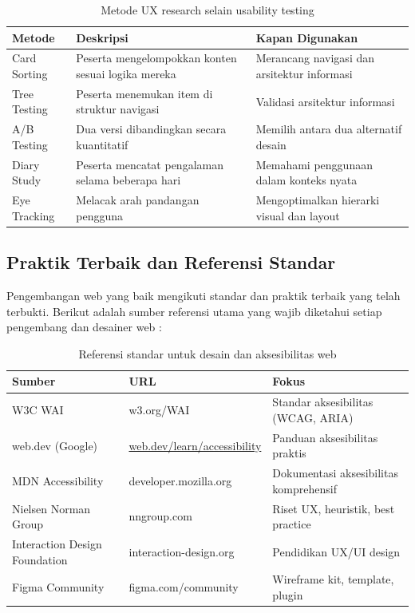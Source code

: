 \begin{table}[htbp]
\centering
\begin{tabular}{|P{3.5cm}|P{4cm}|P{4.5cm}|}
\hline
\textbf{Metode} & \textbf{Deskripsi} & \textbf{Kapan Digunakan} \\
\hline
Card Sorting & Peserta mengelompokkan konten sesuai logika mereka & Merancang navigasi dan arsitektur informasi \\
\hline
Tree Testing & Peserta menemukan item di struktur navigasi & Validasi arsitektur informasi \\
\hline
A/B Testing & Dua versi dibandingkan secara kuantitatif & Memilih antara dua alternatif desain \\
\hline
Diary Study & Peserta mencatat pengalaman selama beberapa hari & Memahami penggunaan dalam konteks nyata \\
\hline
Eye Tracking & Melacak arah pandangan pengguna & Mengoptimalkan hierarki visual dan layout \\
\hline
\end{tabular}
\caption{Metode UX research selain usability testing}
\end{table}

\subsection{Praktik Terbaik dan Referensi Standar}

Pengembangan web yang baik mengikuti standar dan praktik terbaik yang telah terbukti. Berikut adalah sumber referensi utama yang wajib diketahui setiap pengembang dan desainer web \cite{mdnAccessibility} \cite{webdevAccessibility} \cite{wcagW3c}:

\begin{table}[htbp]
\centering
\begin{tabular}{|P{3.5cm}|P{4cm}|P{4.5cm}|}
\hline
\textbf{Sumber} & \textbf{URL} & \textbf{Fokus} \\
\hline
W3C WAI & w3.org/WAI & Standar aksesibilitas (WCAG, ARIA) \\
\hline
web.dev (Google) & \url{web.dev/learn/accessibility} & Panduan aksesibilitas praktis \\
\hline
MDN Accessibility & developer.mozilla.org & Dokumentasi aksesibilitas komprehensif \\
\hline
Nielsen Norman Group & nngroup.com & Riset UX, heuristik, best practice \\
\hline
Interaction Design Foundation & interaction-design.org & Pendidikan UX/UI design \\
\hline
Figma Community & figma.com/community & Wireframe kit, template, plugin \\
\hline
\end{tabular}
\caption{Referensi standar untuk desain dan aksesibilitas web}
\end{table}

